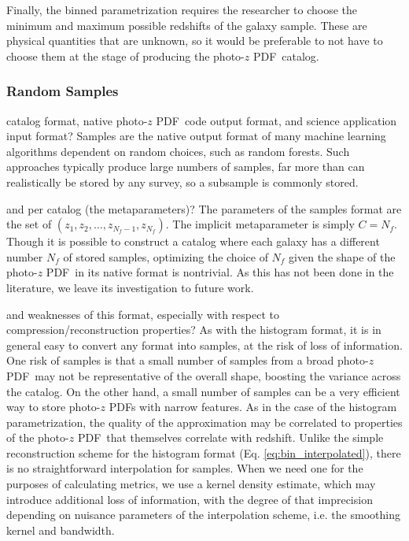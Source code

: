 \documentclass[\docopts]{\docclass}
\newcommand{\pz}{photo-$z$ PDF}
\begin{document}
Finally, the binned parametrization requires the researcher to choose the 
minimum and maximum possible redshifts of the galaxy sample.  These are 
physical quantities that are unknown, so it would be preferable to not have to 
choose them at the stage of producing the \pz\ catalog.

\subsubsection{Random Samples}
\label{sec:samples}

catalog format, native \pz\ code output format, and science application input 
format?
Samples are the native output format of many machine learning algorithms 
dependent on random choices, such as random forests.  Such approaches typically 
produce large numbers of samples, far more than can realistically be stored by 
any survey, so a subsample is commonly stored.  

and per catalog (the metaparameters)?
The parameters of the samples format are the set of $(z_{1}, z_{2}, \dots, 
z_{N_{f}-1}, z_{N_{f}})$.  The implicit metaparameter is simply $C=N_{f}$.  
Though it is possible to construct a catalog where each galaxy has a different 
number $N_{f}$ of stored samples, optimizing the choice of $N_{f}$ given the 
shape of the \pz\ in its native format is nontrivial.  As this has not been 
done in the literature, we leave its investigation to future work.

and weaknesses of this format, especially with respect to 
compression/reconstruction properties?
As with the histogram format, it is in general easy to convert any format into 
samples, at the risk of loss of information.  One risk of samples is that a 
small number of samples from a broad \pz\ may not be representative of the 
overall shape, boosting the variance across the catalog.  On the other hand, a 
small number of samples can be a very efficient way to store \pz s with narrow 
features.  As in the case of the histogram parametrization, the quality of the 
approximation may be correlated to properties of the \pz\ that themselves 
correlate with redshift.  Unlike the simple reconstruction scheme for the 
histogram format (Eq. \ref{eq:bin_interpolated}), there is no straightforward 
interpolation for samples.  When we need one for the purposes of calculating 
metrics, we use a kernel density estimate, which may introduce additional loss 
of information, with the degree of that imprecision depending on nuisance 
parameters of the interpolation scheme, i.e. the smoothing kernel and bandwidth.
\end{document}
